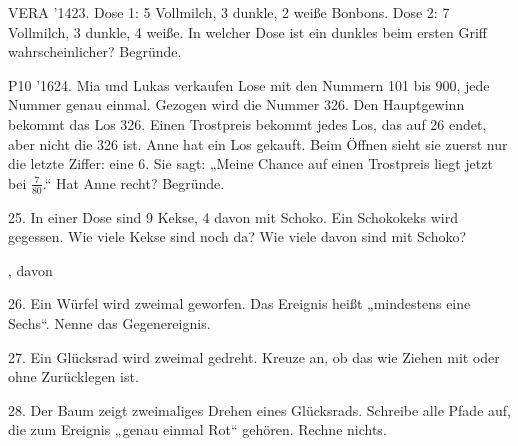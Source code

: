 \documentclass[11pt]{article}
\begin{document}
\pfgruppe{}
\begin{pfaufg}{VERA ’14}{23.}{}
Dose 1: 5 Vollmilch, 3 dunkle, 2 weiße Bonbons. Dose 2: 7 Vollmilch, 3 dunkle, 4 weiße. In welcher Dose ist ein dunkles beim ersten Griff wahrscheinlicher? Begründe.
\end{pfaufg}
\begin{pfaufg}{P10 ’16}{\llap{\textasteriskcentered\,}24.}{}
Mia und Lukas verkaufen Lose mit den Nummern 101 bis 900, jede Nummer genau einmal. Gezogen wird die Nummer 326. Den Hauptgewinn bekommt das Los 326. Einen Trostpreis bekommt jedes Los, das auf 26 endet, aber nicht die 326 ist. Anne hat ein Los gekauft. Beim Öffnen sieht sie zuerst nur die letzte Ziffer: eine 6. Sie sagt: „Meine Chance auf einen Trostpreis liegt jetzt bei $\tfrac{7}{80}$.“ Hat Anne recht? Begründe.
\par\smallskip\noindent {}\par
{}
\end{pfaufg}
\pfgruppe{}
\begin{pfaufg}{}{25.}{}
In einer Dose sind 9 Kekse, 4 davon mit Schoko. Ein Schokokeks wird gegessen. Wie viele Kekse sind noch da? Wie viele davon sind mit Schoko?
\par\noindent \leerfeld[insgesamt] , davon \leerfeld \par
{}
\end{pfaufg}
\begin{pfaufg}{}{26.}{}
Ein Würfel wird zweimal geworfen. Das Ereignis heißt „mindestens eine Sechs“. Nenne das Gegenereignis.
\end{pfaufg}
\begin{pfaufg}{}{27.}{}
Ein Glücksrad wird zweimal gedreht. Kreuze an, ob das wie Ziehen mit oder ohne Zurücklegen ist. 
\end{pfaufg}
\begin{pfaufg}{}{28.}{}
Der Baum zeigt zweimaliges Drehen eines Glücksrads. Schreibe alle Pfade auf, die zum Ereignis „genau einmal Rot“ gehören. Rechne nichts.
\par\smallskip\noindent {}\par
{}
\end{pfaufg}
\end{document}
